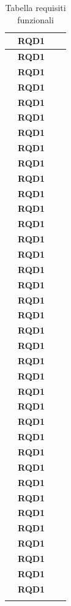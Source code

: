 \begin{longtable}{|r l|p{10cm}|p{2cm}|}
	&\textbf{RQD1}& & \\\hline
	&\textbf{RQD1}& & \\\hline
	&\textbf{RQD1}& & \\\hline
	&\textbf{RQD1}& & \\\hline
	&\textbf{RQD1}& & \\\hline
	&\textbf{RQD1}& & \\\hline
	&\textbf{RQD1}& & \\\hline
	&\textbf{RQD1}& & \\\hline
	&\textbf{RQD1}& & \\\hline
	&\textbf{RQD1}& & \\\hline
	&\textbf{RQD1}& & \\\hline
	&\textbf{RQD1}& & \\\hline
	&\textbf{RQD1}& & \\\hline
	&\textbf{RQD1}& & \\\hline
	&\textbf{RQD1}& & \\\hline
	&\textbf{RQD1}& & \\\hline
	&\textbf{RQD1}& & \\\hline
	&\textbf{RQD1}& & \\\hline
	&\textbf{RQD1}& & \\\hline
	&\textbf{RQD1}& & \\\hline
	&\textbf{RQD1}& & \\\hline
	&\textbf{RQD1}& & \\\hline
	&\textbf{RQD1}& & \\\hline
	&\textbf{RQD1}& & \\\hline
	&\textbf{RQD1}& & \\\hline
	&\textbf{RQD1}& & \\\hline
	&\textbf{RQD1}& & \\\hline
	&\textbf{RQD1}& & \\\hline
	&\textbf{RQD1}& & \\\hline
	&\textbf{RQD1}& & \\\hline
	&\textbf{RQD1}& & \\\hline
	&\textbf{RQD1}& & \\\hline
	&\textbf{RQD1}& & \\\hline
	&\textbf{RQD1}& & \\\hline
	&\textbf{RQD1}& & \\\hline
	&\textbf{RQD1}& & \\\hline
	&\textbf{RQD1}& & \\\hline
	\caption{Tabella requisiti funzionali}
\end{longtable}

